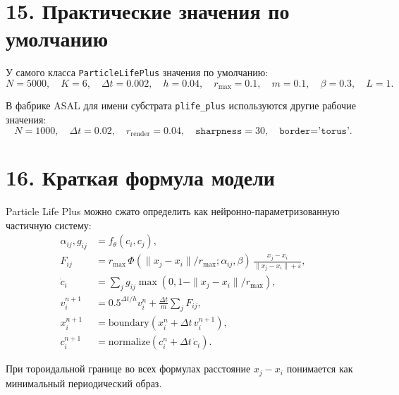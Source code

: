 \documentclass[11pt,a4paper]{article}
\begin{document}
\section*{15. Практические значения по умолчанию}

У самого класса \texttt{ParticleLifePlus} значения по умолчанию:
\[
N=5000,\quad K=6,\quad \Delta t=0.002,\quad h=0.04,\quad
r_{\max}=0.1,\quad m=0.1,\quad \beta=0.3,\quad L=1.
\]

В фабрике ASAL для имени субстрата \texttt{plife\_plus} используются другие
рабочие значения:
\[
N=1000,\quad \Delta t=0.02,\quad
r_{\mathrm{render}}=0.04,\quad
\texttt{sharpness}=30,\quad
\texttt{border='torus'}.
\]

\section*{16. Краткая формула модели}

Particle Life Plus можно сжато определить как нейронно-параметризованную
частичную систему:
\[
\boxed{
\begin{aligned}
\alpha_{ij},g_{ij} &= f_\theta(c_i,c_j),\\
F_{ij} &= r_{\max}\,\Phi(\|x_j-x_i\|/r_{\max};\alpha_{ij},\beta)\,
\frac{x_j-x_i}{\|x_j-x_i\|+\varepsilon},\\
\dot{c}_i &= \sum_j g_{ij}\max(0,1-\|x_j-x_i\|/r_{\max}),\\
v_i^{n+1} &= 0.5^{\Delta t/h}v_i^n+\frac{\Delta t}{m}\sum_j F_{ij},\\
x_i^{n+1} &= \mathrm{boundary}(x_i^n+\Delta t\,v_i^{n+1}),\\
c_i^{n+1} &= \mathrm{normalize}(c_i^n+\Delta t\,\dot{c}_i).
\end{aligned}}
\]

При тороидальной границе во всех формулах расстояние $x_j-x_i$ понимается как
минимальный периодический образ.
\end{document}
